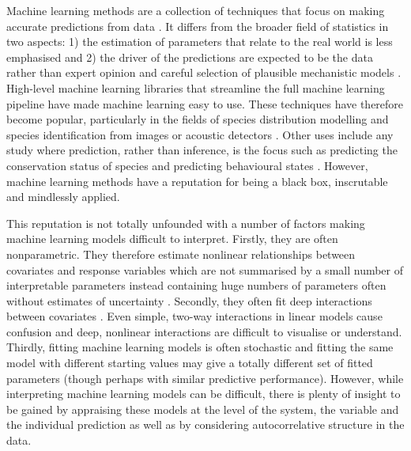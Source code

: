 \documentclass[12pt]{article}
\begin{document}
Machine learning methods are a collection of techniques that focus on making accurate predictions from data \citep{crisci2012review, breiman2001statistical, domingos}.
It differs from the broader field of statistics in two aspects: 1) the estimation of parameters that relate to the real world is less emphasised and 2) the driver of the predictions are expected to be the data rather than expert opinion and careful selection of plausible mechanistic models \citep{breiman2001statistical, domingos}.
High-level machine learning libraries that streamline the full machine learning pipeline \citep{caret, scikit, maxent, biomod} have made machine learning easy to use.
These techniques have therefore become popular, particularly in the fields of species distribution modelling \citep{maxent, biomod, elith2006novel, golding2018zoon, gobeyn2019evolutionary} and species identification from images or acoustic detectors \citep{mac2018bat, waldchen2018machine, shamir2014classification, xue2017automatic, fairbrass2019citynet}.
Other uses include any study where prediction, rather than inference, is the focus such as predicting the conservation status of species \citep{bland2015predicting} and predicting behavioural states \citep{browning2018predicting}.
However, machine learning methods have a reputation for being a black box, inscrutable and mindlessly applied.

This reputation is not totally unfounded with a number of factors making machine learning models difficult to interpret.
Firstly, they are often nonparametric.
They therefore estimate nonlinear relationships between covariates and response variables which are not summarised by a small number of interpretable parameters instead containing huge numbers of parameters often without estimates of uncertainty \citep{domingos}.
Secondly, they often fit deep interactions between covariates \citep{lunetta2004screening}.
Even simple, two-way interactions in linear models cause confusion \citep{engqvist2005mistreatment, lamina2012visualizing} and deep, nonlinear interactions are difficult to visualise or understand.
Thirdly, fitting machine learning models is often stochastic \citep{breiman2001random, glorot2002understanding} and fitting the same model with different starting values may give a totally different set of fitted parameters (though perhaps with similar predictive performance).
However, while interpreting machine learning models can be difficult, there is plenty of insight to be gained by appraising these models at the level of the system, the variable and the individual prediction as well as by considering autocorrelative structure in the data.
\end{document}
